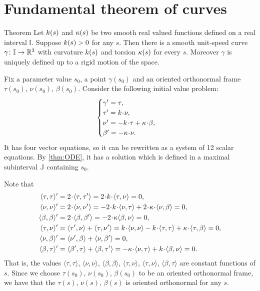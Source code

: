 \section*{Fundamental theorem of curves}

\begin{thm}{Theorem}\label{thm:fund-curves}
Let $k(s)$ and $\kappa(s)$ be two smooth real valued functions defined on a real interval $\mathbb{I}$.
Suppose $k(s)>0$ for any $s$.
Then there is a smooth unit-speed curve $\gamma\colon\mathbb{I}\to\mathbb{R}^3$ with curvature $k(s)$ and torsion $\kappa(s)$ for every $s$.
Moreover $\gamma$ is uniquely defined up to a rigid motion of the space.
\end{thm}

Fix a parameter value $s_0$, a point $\gamma(s_0)$ and an oriented orthonormal frame $\tau(s_0)$, $\nu(s_0)$, $\beta(s_0)$.
Consider the following initial value problem: 
\[
\begin{cases}
\gamma'=\tau,
\\
\tau'=\kur\cdot\nu,
\\
\nu'=-\kur\cdot\tau+\tor\cdot\beta,
\\
\beta'=-\tor\cdot\nu.
\end{cases}
\]
It has four vector equations, so it can be rewritten as a system of 12 scalar equations.
By \ref{thm:ODE}, it has a solution which is defined in a maximal subinterval $\mathbb{J}$ containing $s_0$.

Note that 
\begin{align*}
\langle\tau,\tau\rangle'
&=
2\cdot\langle\tau,\tau'\rangle
=
2\cdot\kur\cdot \langle\tau,\nu\rangle
=
0,
\\
\langle\nu,\nu\rangle'
&=
2\cdot\langle\nu,\nu'\rangle
=
-
2\cdot\kur\cdot\langle\nu,\tau\rangle
+
2\cdot\tor\cdot\langle\nu,\beta\rangle
=
0,
\\
\langle\beta,\beta\rangle'
&=
2\cdot\langle\beta,\beta'\rangle
=
-2\cdot\tor\langle\beta,\nu\rangle
=
0,
\\
\langle\tau,\nu\rangle'
&=
\langle\tau',\nu\rangle
+
\langle\tau,\nu'\rangle
=
\kur\cdot\langle\nu,\nu\rangle
-
\kur\cdot\langle\tau,\tau\rangle
+
\tor\cdot\langle\tau,\beta\rangle
=
0,
\\
\langle\nu,\beta\rangle'
&=
\langle\nu',\beta\rangle+\langle\nu,\beta'\rangle
=0,
\\
\langle\beta,\tau\rangle'
&=
\langle\beta',\tau\rangle+\langle\beta,\tau'\rangle
=
-\tor\cdot \langle\nu,\tau\rangle
+\kur\cdot\langle\beta,\nu\rangle
=0.
\end{align*}
That is, the values 
$\langle\tau,\tau\rangle$,
$\langle\nu,\nu\rangle$,
$\langle\beta,\beta\rangle$,
$\langle\tau,\nu\rangle$,
$\langle\tau,\nu\rangle$,
$\langle\beta,\tau\rangle$
are constant functions of $s$.
Since we choose $\tau(s_0)$, $\nu(s_0)$, $\beta(s_0)$ to be an oriented orthonormal frame, we have that the $\tau(s)$, $\nu(s)$, $\beta(s)$ is oriented orthonormal for any $s$.

